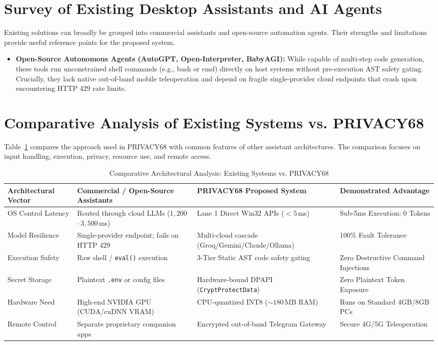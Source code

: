 \documentclass[12pt,letterpaper,oneside]{report}
\begin{document}
\section{Survey of Existing Desktop Assistants and AI Agents}
Existing solutions can broadly be grouped into commercial assistants and open-source automation agents. Their strengths and limitations provide useful reference points for the proposed system.
\begin{itemize}
    \item \textbf{Open-Source Autonomous Agents (AutoGPT, Open-Interpreter, BabyAGI):} While capable of multi-step code generation, these tools run unconstrained shell commands (e.g., bash or cmd) directly on host systems without pre-execution AST safety gating. Crucially, they lack native out-of-band mobile teleoperation and depend on fragile single-provider cloud endpoints that crash upon encountering HTTP 429 rate limits.
\end{itemize}

\section{Comparative Analysis of Existing Systems vs. PRIVACY68}
Table~\ref{tab:comp_analysis} compares the approach used in PRIVACY68 with common features of other assistant architectures. The comparison focuses on input handling, execution, privacy, resource use, and remote access.

\begin{table}[H]
\centering
\caption{Comparative Architectural Analysis: Existing Systems vs. PRIVACY68}
\label{tab:comp_analysis}
\begin{tabularx}{\textwidth}{|l|X|X|X|}
\hline
\textbf{Architectural Vector} & \textbf{Commercial / Open-Source Assistants} & \textbf{PRIVACY68 Proposed System} & \textbf{Demonstrated Advantage}\\ \hline
OS Control Latency & Routed through cloud LLMs ($1{,}200$--$3{,}500$\,ms) & Lane 1 Direct Win32 APIs ($<5$\,ms) & Sub-5ms Execution; 0 Tokens\\ \hline
Model Resilience & Single-provider endpoint; fails on HTTP 429 & Multi-cloud cascade (Groq/Gemini/Claude/Ollama) & 100\% Fault Tolerance\\ \hline
Execution Safety & Raw shell / \texttt{eval()} execution & 3-Tier Static AST code safety gating & Zero Destructive Command Injections\\ \hline
Secret Storage & Plaintext \texttt{.env} or config files & Hardware-bound DPAPI (\texttt{CryptProtectData}) & Zero Plaintext Token Exposure\\ \hline
Hardware Need & High-end NVIDIA GPU (CUDA/cuDNN VRAM) & CPU-quantized INT8 ($\sim 180$\,MB RAM) & Runs on Standard 4GB/8GB PCs\\ \hline
Remote Control & Separate proprietary companion apps & Encrypted out-of-band Telegram Gateway & Secure 4G/5G Teleoperation\\ \hline
\end{tabularx}
\end{table}
\end{document}
